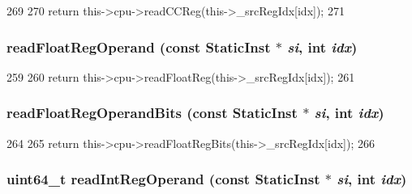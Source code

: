 \begin{DoxyCode}
269     {
270         return this->cpu->readCCReg(this->_srcRegIdx[idx]);
271     }
\end{DoxyCode}
\hypertarget{classBaseO3DynInst_a717c88c8c56d79c9ed554ba5992bd8c3}{
\subsubsection[{readFloatRegOperand}]{ readFloatRegOperand (const {\bf StaticInst} $\ast$ {\em si}, \/  int {\em idx})}}
\label{classBaseO3DynInst_a717c88c8c56d79c9ed554ba5992bd8c3}



\begin{DoxyCode}
259     {
260         return this->cpu->readFloatReg(this->_srcRegIdx[idx]);
261     }
\end{DoxyCode}
\hypertarget{classBaseO3DynInst_a39d93624e4481f4a210f2c46ea6b15b0}{
\subsubsection[{readFloatRegOperandBits}]{ readFloatRegOperandBits (const {\bf StaticInst} $\ast$ {\em si}, \/  int {\em idx})}}
\label{classBaseO3DynInst_a39d93624e4481f4a210f2c46ea6b15b0}



\begin{DoxyCode}
264     {
265         return this->cpu->readFloatRegBits(this->_srcRegIdx[idx]);
266     }
\end{DoxyCode}
\hypertarget{classBaseO3DynInst_a9e7b0a4d5373c48902425c9456b19e7e}{
\subsubsection[{readIntRegOperand}]{\setlength{\rightskip}{0pt plus 5cm}uint64\_\-t readIntRegOperand (const {\bf StaticInst} $\ast$ {\em si}, \/  int {\em idx})}}
\label{classBaseO3DynInst_a9e7b0a4d5373c48902425c9456b19e7e}



